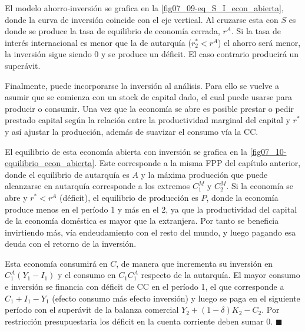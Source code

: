 \documentclass[DeGregorioResumen]{subfiles}
\begin{document}
El modelo ahorro-inversión se grafica en la \autoref{fig07_09-eq_S_I_econ_abierta}, donde la curva de inversión coincide con el eje vertical. Al cruzarse esta con $S$ es donde se produce la tasa de equilibrio de economía cerrada, $r^A$. Si la tasa de interés internacional es menor que la de autarquía ($r_2^*<r^A$) el ahorro será menor, la inversión sigue siendo 0 y se produce un déficit. El caso contrario producirá un superávit.



Finalmente, puede incorporarse la inversión al análisis. Para ello se vuelve a asumir que se comienza con un stock de capital dado, el cual puede usarse para producir o consumir. Una vez que la economía se abre es posible prestar o pedir prestado capital según la relación entre la productividad marginal del capital y $r^*$ y así ajustar la producción, además de suavizar el consumo vía la CC.

El equilibrio de esta economía abierta con inversión se grafica en la \autoref{fig07_10-equilibrio_econ_abierta}. Este corresponde a la misma FPP del capítulo anterior, donde el equilibrio de autarquía es $A$ y la máxima producción que puede alcanzarse en autarquía corresponde a los extremos $C_1^M$ y $C_2^M$. Si la economía se abre y $r^*<r^A$ (déficit), el equilibrio de producción es $P$, donde la economía produce menos en el período 1 y más en el 2, ya que la productividad del capital de la economía doméstica es mayor que la extranjera. Por tanto se beneficia invirtiendo más, vía endeudamiento con el resto del mundo, y luego pagando esa deuda con el retorno de la inversión.

Esta economía consumirá en $C$, de manera que incrementa su inversión en $C_1^A(Y_1-I_1)$ y el consumo en $C_1C_1^A$ respecto de la autarquía. El mayor consumo e inversión se financia con déficit de CC en el período 1, el que corresponde a $C_1+I_1-Y_1$ (efecto consumo más efecto inversión) y luego se paga en el siguiente período con el superávit de la balanza comercial $Y_2+(1-\delta)K_2-C_2$. Por restricción presupuestaria los déficit en la cuenta corriente deben sumar 0. $\blacksquare$


\end{document}
